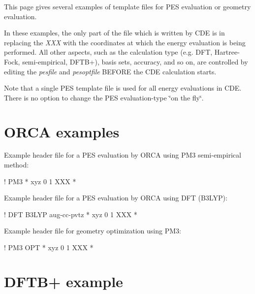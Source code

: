 This page gives several examples of template files for P\+ES evaluation or geometry evaluation.

In these examples, the only part of the file which is written by C\+DE is in replacing the {\itshape X\+XX} with the coordinates at which the energy evaluation is being performed. All other aspects, such as the calculation type (e.\+g. D\+FT, Hartree-\/\+Fock, semi-\/empirical, D\+F\+T\+B+), basis sets, accuracy, and so on, are controlled by editing the {\itshape pesfile} and {\itshape pesoptfile} B\+E\+F\+O\+RE the C\+DE calculation starts.

Note that a single P\+ES template file is used for all energy evaluations in C\+DE. There is no option to change the P\+ES evaluation-\/type \char`\"{}on the fly\char`\"{}.

\section*{O\+R\+CA examples}


\begin{DoxyItemize}
\item Example header file for a P\+ES evaluation by O\+R\+CA using P\+M3 semi-\/empirical method\+:
\end{DoxyItemize}

\begin{DoxyVerb}    ! PM3
    * xyz 0 1
    XXX
    *
\end{DoxyVerb}



\begin{DoxyItemize}
\item Example header file for a P\+ES evaluation by O\+R\+CA using D\+FT (B3\+L\+YP)\+:
\end{DoxyItemize}

\begin{DoxyVerb}! DFT B3LYP aug-cc-pvtz 
    * xyz 0 1
    XXX
    *
\end{DoxyVerb}



\begin{DoxyItemize}
\item Example header file for geometry optimization using P\+M3\+:
\end{DoxyItemize}

\begin{DoxyVerb}    ! PM3 OPT  
    * xyz 0 1
    XXX
    *
\end{DoxyVerb}


\section*{D\+F\+T\+B+ example}

